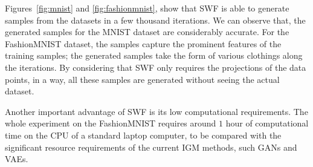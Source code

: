 Figures~\ref{fig:mnist} and \ref{fig:fashionmnist}, show that SWF is able to generate samples from the datasets in a few thousand iterations. We can observe that, the generated samples for the MNIST dataset are considerably accurate. For the FashionMNIST dataset, the samples capture the prominent features of the training samples; the generated samples take the form of various clothings along the iterations. By considering that SWF only requires the projections of the data points, in a way, all these samples are generated without seeing the actual dataset.




Another important advantage of SWF is its low computational requirements. The whole experiment on the FashionMNIST requires around $1$ hour of computational time on the CPU of a standard laptop computer, to be compared with the significant resource requirements of the current IGM methods, such GANs and VAEs.



















